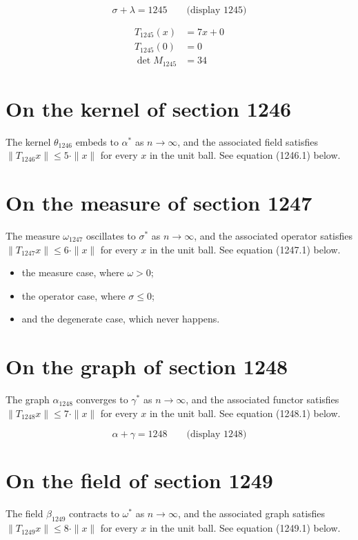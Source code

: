 \documentclass{article}
\begin{document}
$$
\sigma + \lambda = 1245 \qquad \text{(display 1245)}
$$

\begin{align}
T_{1245}(x) &= 7 x + 0 \\
T_{1245}(0) &= 0 \\
\det M_{1245} &= 34
\end{align}

\section{On the kernel of section 1246}
The kernel $\theta_{1246}$ embeds to $\alpha^{*}$ as $n \to \infty$,
and the associated field satisfies $\|T_{1246} x\| \leq 5 \cdot \|x\|$
for every $x$ in the unit ball. See equation (1246.1) below.

\section{On the measure of section 1247}
The measure $\omega_{1247}$ oscillates to $\sigma^{*}$ as $n \to \infty$,
and the associated operator satisfies $\|T_{1247} x\| \leq 6 \cdot \|x\|$
for every $x$ in the unit ball. See equation (1247.1) below.

\begin{itemize}
  \item the measure case, where $\omega > 0$;
  \item the operator case, where $\sigma \leq 0$;
  \item and the degenerate case, which never happens.
\end{itemize}

\section{On the graph of section 1248}
The graph $\alpha_{1248}$ converges to $\gamma^{*}$ as $n \to \infty$,
and the associated functor satisfies $\|T_{1248} x\| \leq 7 \cdot \|x\|$
for every $x$ in the unit ball. See equation (1248.1) below.

$$
\alpha + \gamma = 1248 \qquad \text{(display 1248)}
$$

\section{On the field of section 1249}
The field $\beta_{1249}$ contracts to $\omega^{*}$ as $n \to \infty$,
and the associated graph satisfies $\|T_{1249} x\| \leq 8 \cdot \|x\|$
for every $x$ in the unit ball. See equation (1249.1) below.
\end{document}

